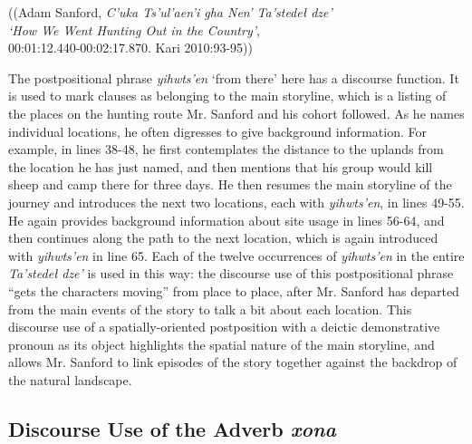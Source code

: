 \begin{exe}
\begin{xlist}
\end{xlist}
\begin{flushright}
((Adam Sanford, \textit{C’uka Ts’ul’aen’i gha Nen’ Ta’stedeł dze’}\\
\textit{‘How We Went Hunting Out in the Country’},\\
00:01:12.440-00:02:17.870. Kari 2010:93-95))
\end{flushright}
\end{exe}

The postpositional phrase \textit{yihwts’en} ‘from there’ here has a discourse function. It is used to mark clauses as belonging to the main storyline, which is a listing of the places on the hunting route Mr. Sanford and his cohort followed. As he names individual locations, he often digresses to give background information. For example, in lines 38-48, he first contemplates the distance to the uplands from the location he has just named, and then mentions that his group would kill sheep and camp there for three days. He then resumes the main storyline of the journey and introduces the next two locations, each with \textit{yihwts’en}, in lines 49-55. He again provides background information about site usage in lines 56-64, and then continues along the path to the next location, which is again introduced with \textit{yihwts’en} in line 65. Each of the twelve occurrences of \textit{yihwts’en} in the entire \textit{Ta’stedeł} \textit{dze’} is used in this way: the discourse use of this postpositional phrase “gets the characters moving” from place to place, after Mr. Sanford has departed from the main events of the story to talk a bit about each location. This discourse use of a spatially-oriented postposition with a deictic demonstrative pronoun as its object highlights the spatial nature of the main storyline, and allows Mr. Sanford to link episodes of the story together against the backdrop of the natural landscape.

\subsection{Discourse Use of the Adverb \textit{xona}}

